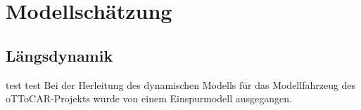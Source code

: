 \chapter{Modellschätzung} \label{chap:estimate}

\section{Längsdynamik} \label{sec:laengsdynamik}
test test
Bei der Herleitung des dynamischen Modells für das Modellfahrzeug des oTToCAR-Projekts wurde von einem Einspurmodell ausgegangen. 